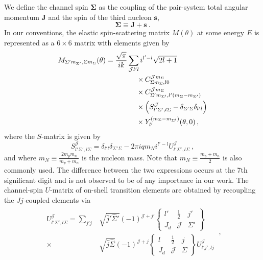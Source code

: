 \documentclass[aps,prc,showpacs,twocolumn,floatfix,nobibnotes,nofootinbib,amsmath,amssymb,longbibliography]{revtex4-2}
\begin{document}
We define the channel spin $\bm{\Sigma}$ as the coupling of the
pair-system total angular momentum $\bm{J}$ and the spin of the
third nucleon $\bm{s}$,
\begin{equation}
	 \bm{\Sigma} \equiv \bm{J} + \bm{s}\:.
\end{equation}
In our conventions, the elastic spin-scattering matrix
$M(\theta)$ at some energy $E$ is represented as a
$6\times6$ matrix with elements given by
\begin{align}
	\begin{split}
	M_{\Sigma' m_{\Sigma'},\Sigma m_{\Sigma}}(\theta) &= \frac{\sqrt{\pi}}{ik} \sum_{\mathcal{J}l'l} i^{l'-l}\sqrt{2l+1} \\
	&\hspace{1.5cm}\times C_{\Sigma m_{\Sigma}, l 0}^{\mathcal{J} m_{\Sigma}} \\
	&\hspace{1.5cm}\times C_{\Sigma' m_{\Sigma'}, l' (m_{\Sigma} - m_{\Sigma'})}^{\mathcal{J} m_{\Sigma}} \\
	&\hspace{1.5cm}\times \left(S^{\mathcal{J}}_{l'\Sigma',l\Sigma} - \delta_{\Sigma'\Sigma}\delta_{l'l}\right) \\
	&\hspace{1.5cm}\times Y_{l'}^{(m_{\Sigma} - m_{\Sigma'}) }(\theta,0) \, ,
	\end{split}
\end{align}
where the $S$-matrix is given by
\begin{equation}
	S^{\mathcal{J}}_{l'\Sigma',l\Sigma} = \delta_{l'l}\delta_{\Sigma'\Sigma} - 2\pi iq m_N i^{l'-l}U^{\mathcal{J}}_{l'\Sigma',l\Sigma}\:,
\end{equation}
and where $m_N\equiv\frac{2m_pm_n}{m_p+m_n}$ is the nucleon
mass. Note that $m_N\equiv\frac{m_p+m_n}{2}$ is also commonly
  used. The difference between the two expressions occurs at the 7th
  significant digit and is not observed to be of any importance in our
  work. The channel-spin $U$-matrix of on-shell transition elements
are obtained by recoupling the $Jj$-coupled elements via
\begin{align}
	\begin{split}
	U_{l'\Sigma',l\Sigma}^{\mathcal{J}} = \sum_{j'j}&\sqrt{\hat{j}'\hat{\Sigma}'}(-1)^{\mathcal{J} + j'}
	\begin{Bmatrix}
	l' & \frac{1}{2} & j' \\
	J_d & \mathcal{J} & \Sigma'
	\end{Bmatrix}\\
	\times&
	\sqrt{\hat{j}\hat{\Sigma}}(-1)^{\mathcal{J} + j}
	\begin{Bmatrix}
	l & \frac{1}{2} & j \\
	J_d & \mathcal{J} & \Sigma
	\end{Bmatrix}
	U_{l'j',lj}^{\mathcal{J}}
	\end{split} \:,
\end{align}
\end{document}
